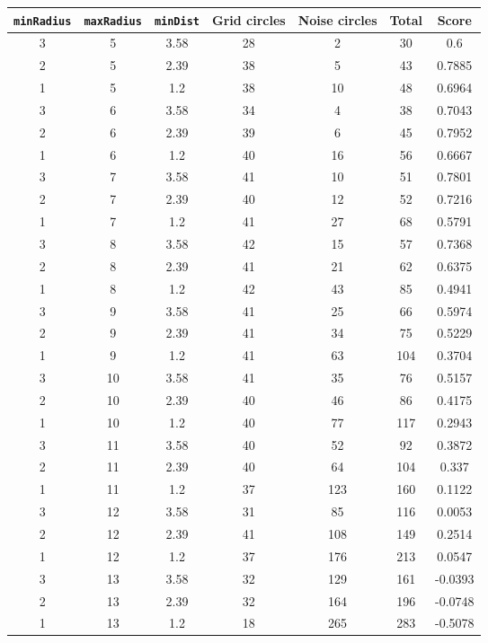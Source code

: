 \documentclass[letterpaper, 12pt]{article}
\begin{document}
\begin{longtable}{|c|c|c|c|c|c|c|}
\hline
\textbf{\texttt{minRadius}} & \textbf{\texttt{maxRadius}} & \textbf{\texttt{minDist}} & \textbf{Grid circles} & \textbf{Noise circles} & \textbf{Total} & \textbf{Score} \\
\hline
3 & 5 & 3.58 & 28 & 2 & 30 & 0.6 \\
\hline
2 & 5 & 2.39 & 38 & 5 & 43 & 0.7885 \\
\hline
1 & 5 & 1.2 & 38 & 10 & 48 & 0.6964 \\
\hline
3 & 6 & 3.58 & 34 & 4 & 38 & 0.7043 \\
\hline
2 & 6 & 2.39 & 39 & 6 & 45 & 0.7952 \\
\hline
1 & 6 & 1.2 & 40 & 16 & 56 & 0.6667 \\
\hline
3 & 7 & 3.58 & 41 & 10 & 51 & 0.7801 \\
\hline
2 & 7 & 2.39 & 40 & 12 & 52 & 0.7216 \\
\hline
1 & 7 & 1.2 & 41 & 27 & 68 & 0.5791 \\
\hline
3 & 8 & 3.58 & 42 & 15 & 57 & 0.7368 \\
\hline
2 & 8 & 2.39 & 41 & 21 & 62 & 0.6375 \\
\hline
1 & 8 & 1.2 & 42 & 43 & 85 & 0.4941 \\
\hline
3 & 9 & 3.58 & 41 & 25 & 66 & 0.5974 \\
\hline
2 & 9 & 2.39 & 41 & 34 & 75 & 0.5229 \\
\hline
1 & 9 & 1.2 & 41 & 63 & 104 & 0.3704 \\
\hline
3 & 10 & 3.58 & 41 & 35 & 76 & 0.5157 \\
\hline
2 & 10 & 2.39 & 40 & 46 & 86 & 0.4175 \\
\hline
1 & 10 & 1.2 & 40 & 77 & 117 & 0.2943 \\
\hline
3 & 11 & 3.58 & 40 & 52 & 92 & 0.3872 \\
\hline
2 & 11 & 2.39 & 40 & 64 & 104 & 0.337 \\
\hline
1 & 11 & 1.2 & 37 & 123 & 160 & 0.1122 \\
\hline
3 & 12 & 3.58 & 31 & 85 & 116 & 0.0053 \\
\hline
2 & 12 & 2.39 & 41 & 108 & 149 & 0.2514 \\
\hline
1 & 12 & 1.2 & 37 & 176 & 213 & 0.0547 \\
\hline
3 & 13 & 3.58 & 32 & 129 & 161 & -0.0393 \\
\hline
2 & 13 & 2.39 & 32 & 164 & 196 & -0.0748 \\
\hline
1 & 13 & 1.2 & 18 & 265 & 283 & -0.5078 \\

\end{longtable}
\end{document}
